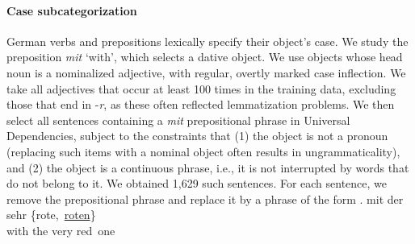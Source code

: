 %
%

\paragraph{Case subcategorization}
German verbs and prepositions lexically specify their object's case.  We
study the preposition \textit{mit} `with', which selects a dative
object. We use objects whose head noun is a nominalized adjective,
with regular, overtly marked case inflection.  We take all adjectives
that occur at least 100 times in the training data, excluding those
that end in -\emph{r}, as these often reflected lemmatization
problems. We then select all sentences containing a \emph{mit}
prepositional phrase in Universal Dependencies, subject to the
constraints that (1) the object is not a pronoun (replacing such items with a
nominal object often results in ungrammaticality), and (2) the object
is a continuous phrase, i.e., it is not interrupted by words that do
not belong to it. %
We obtained 1,629 such sentences.  For each sentence, we remove the
prepositional phrase and replace it by a phrase of the form
\exg. mit der sehr \{rote,\ \underline{roten}\} \\
with the very red\ one \\

